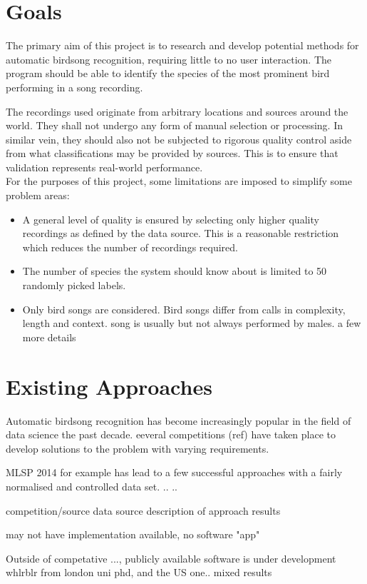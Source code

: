 \section{Goals}
The primary aim of this project is to research and develop potential methods
for automatic birdsong recognition, requiring little to no user interaction.
The program should be able to identify the species of the most prominent bird
performing in a song recording.

The recordings used originate from arbitrary locations and sources around the
world.
They shall not undergo any form of manual selection or processing.
In similar vein, they should also not be subjected to rigorous quality control
aside from what classifications may be provided by sources.
This is to ensure that validation represents real-world performance.\\

For the purposes of this project, some limitations are imposed to simplify some
problem areas:
\begin{itemize}
\item A general level of quality is ensured by selecting only higher quality recordings
      as defined by the data source.
      This is a reasonable restriction which reduces the number of recordings required.
\item The number of species the system should know about is limited to 50
      randomly picked labels.
\item Only bird songs are considered.
      Bird songs differ from calls in complexity, length and context.
      song is usually but not always performed by males.
      a few more details
\end{itemize}


\section{Existing Approaches}
Automatic birdsong recognition has become increasingly popular in the field of
data science the past decade.
eeveral competitions (ref) have taken place to develop solutions to the problem
with varying requirements.

MLSP 2014 for example has lead to a few successful approaches with a fairly
normalised and controlled data set.
..
..

competition/source
data source
description of approach
results

may not have implementation available, no software "app"

Outside of competative ..., publicly available software is under development
whlrblr from london uni phd, and the US one..
mixed results
